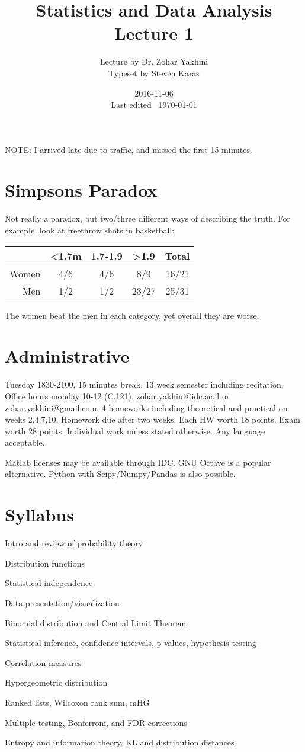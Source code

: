 \documentclass[a4paper]{article}
\title{Statistics and Data Analysis\\\large Lecture 1}
\date{2016-11-06 \\ Last edited \currenttime\ \today}
\author{Lecture by Dr. Zohar Yakhini\\Typeset by Steven Karas}
\newenvironment{enumerate*}%
  {\begin{enumerate}%
    \setlength{\itemsep}{0.5pt}%
    \setlength{\parsep}{0pt}%
    \setlength{\parskip}{0pt}}%
  {\end{enumerate}}
\begin{document}
\maketitle

NOTE: I arrived late due to traffic, and missed the first 15 minutes.

\section{Simpsons Paradox}
Not really a paradox, but two/three different ways of describing the truth. For example, look at freethrow shots in basketball:

\begin{tabu} to \linewidth{|r|c|c|c|c|}
\hline
& <1.7m & 1.7-1.9 & >1.9 & Total \\
\hline
Women & 4/6 & 4/6 & 8/9 & 16/21 \\
\hline
Men & 1/2 & 1/2 & 23/27 & 25/31 \\
\hline
\end{tabu}

The women beat the men in each category, yet overall they are worse.

\section{Administrative}
Tuesday 1830-2100, 15 minutes break.
13 week semester including recitation.
Office hours monday 10-12 (C.121).
zohar.yakhini@idc.ac.il or zohar.yakhini@gmail.com.
4 homeworks including theoretical and practical on weeks 2,4,7,10.
Homework due after two weeks.
Each HW worth 18 points.
Exam worth 28 points.
Individual work unless stated otherwise.
Any language acceptable.

Matlab licenses may be available through IDC. GNU Octave is a popular alternative. Python with Scipy/Numpy/Pandas is also possible.

\section{Syllabus}

\begin{enumerate*}
\item Intro and review of probability theory
\item Distribution functions
\item Statistical independence
\item Data presentation/visualization
\item Binomial distribution and Central Limit Theorem
\item Statistical inference, confidence intervals, p-values, hypothesis testing
\item Correlation measures
\item Hypergeometric distribution
\item Ranked lists, Wilcoxon rank sum, mHG
\item Multiple testing, Bonferroni, and FDR corrections
\item Entropy and information theory, KL and distribution distances
\end{enumerate*}
\end{document}
